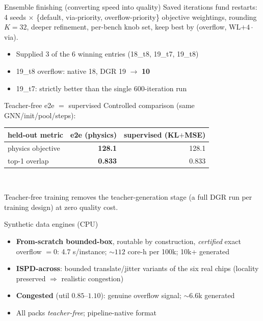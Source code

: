 \documentclass[10pt]{beamer}
\begin{document}
\begin{frame}{Ensemble finishing (converting speed into quality)}
Saved iterations fund restarts: 4 seeds $\times$
\{default, via-priority, overflow-priority\} objective weightings,
rounding $K{=}32$, deeper refinement, per-bench knob set,
keep best by (overflow, WL$+4\cdot$via).\\[8pt]
\begin{itemize}
\item Supplied 3 of the 6 winning entries (18\_t8, 19\_t7, 19\_t8)
\item 19\_t8 overflow: native 18, DGR 19 $\rightarrow$ \textbf{10}
\item 19\_t7: strictly better than the single 600-iteration run
\end{itemize}
\end{frame}

\begin{frame}{Teacher-free e2e $=$ supervised}
Controlled comparison (same GNN/init/pool/steps):\\[6pt]
\centering\small
\begin{tabular}{lrr}
\toprule
held-out metric & e2e (physics) & supervised (KL$+$MSE)\\
\midrule
physics objective & \textbf{128.1} & 128.1\\
top-1 overlap & \textbf{0.833} & 0.833\\
\bottomrule
\end{tabular}\\[8pt]
\raggedright
Teacher-free training removes the teacher-generation stage (a full DGR run
per training design) at zero quality cost.
\end{frame}

\begin{frame}{Synthetic data engines (CPU)}
\begin{itemize}
\item \textbf{From-scratch bounded-box}, routable by construction,
      \emph{certified} exact overflow $=0$: 4.7 s/instance;
      ${\sim}112$ core-h per 100k; 10k+ generated
\item \textbf{ISPD-across}: bounded translate/jitter variants of the six
      real chips (locality preserved $\Rightarrow$ realistic congestion)
\item \textbf{Congested} (util $0.85$--$1.10$): genuine overflow signal;
      ${\sim}6.6$k generated
\item All packs \emph{teacher-free}; pipeline-native format
\end{itemize}
\end{frame}
\end{document}
